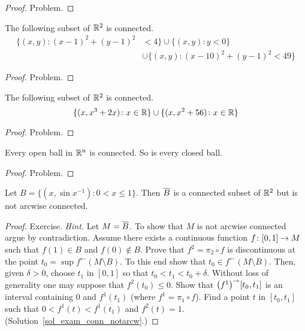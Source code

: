 \begin{proof} Problem.  \ns  \end{proof}

\begin{exam} The following subset of $\mathbb{R}^2$ is connected.
 \[ \begin{split}
       \{(x,y) \colon (x-1)^2 + (y-1)^2 &< 4\} \cup \{(x,y) \colon y < 0\} \\
         &\cup  \{(x,y) \colon (x-10)^2 + (y-1)^2 < 49\}
    \end{split}\]
\end{exam}

\begin{proof} Problem.  \ns  \end{proof}

\begin{exam} The following subset of $\mathbb{R}^2$ is connected.
  \[ \{(x,x^3 + 2x) \colon x \in \mathbb{R}\} \cup \{(x,x^2+56) \colon x \in \mathbb{R}\} \]
\end{exam}

\begin{proof} Problem.  \ns  \end{proof}

\begin{exam} Every open ball in $\mathbb{R}^n$ is connected.  So is every closed ball.
\end{exam}

\begin{proof} Problem.  \ns   \end{proof}

\begin{exam}\label{exam_conn_notarcw} Let $B = \{(x,\sin x^{-1}) \colon 0 < x \le 1\}$.  Then
$\overline{B}$ is a connected subset of $\mathbb{R}^2$ but is not arcwise connected.
\end{exam}

\begin{proof} Exercise. \emph{Hint.}  Let $M = \overline{B}$.  To show that $M$ is not arcwise
connected argue by contradiction.  Assume there exists a continuous function $f \colon [0,1]
\rightarrow M$ such that $f(1) \in B$ and $f(0) \notin B$.  Prove that $f^2 = \pi_2 \circ f$ is
discontinuous at the point $t_0 = \sup f^\gets(M \setminus B)$.  To this end show that $t_0
\in f^\gets(M \setminus B)$.  Then, given $\delta > 0$, choose $t_1$ in $[0,1]$ so that $t_0 <
t_1 < t_0 + \delta$.  Without loss of generality one may suppose that $f^2(t_0) \le 0$.  Show
that $\bigl(f^1\bigr)^\rightarrow[t_0,t_1]$ is an interval containing $0$ and $f^1(t_1)$ (where $f^1
= \pi_1 \circ f$).  Find a point $t$ in $[t_0,t_1]$ such that $0 < f^1(t) < f^1(t_1)$ and
$f^2(t) = 1$. (Solution~\ref{sol_exam_conn_notarcw}.) \ns
\end{proof}

